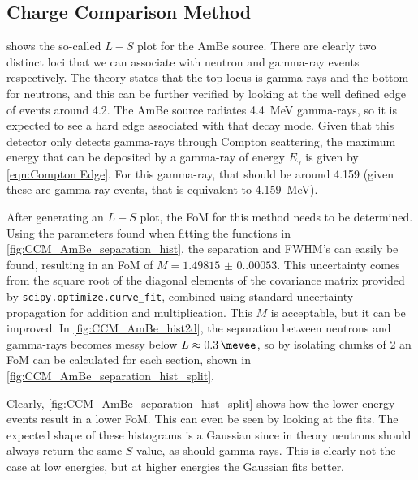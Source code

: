 \documentclass[11pt]{article}
\numberwithin{equation}{section}
\numberwithin{figure}{section}
\numberwithin{table}{section}
\begin{document}
\subsection{Charge Comparison Method}
\par {} shows the so-called $L-S$ plot for the AmBe source. There are clearly two distinct loci that we can associate with neutron and gamma-ray events respectively. The theory states that the top locus is gamma-rays and the bottom for neutrons, and this can be further verified by looking at the well defined edge of events around \SI{4.2}{\mevee}. The AmBe source radiates \SI{4.4}{\mega\electronvolt} gamma-rays, so it is expected to see a hard edge associated with that decay mode. Given that this detector only detects gamma-rays through Compton scattering, the maximum energy that can be deposited by a gamma-ray of energy $E_\gamma$ is given by \cref{eqn:Compton Edge}. For this gamma-ray, that should be around \SI{4.159}{\mevee} (given these are gamma-ray events, that is equivalent to \SI{4.159}{\mega\electronvolt}). 
\par After generating an $L-S$ plot, the FoM for this method needs to be determined. Using the parameters found when fitting the functions in \cref{fig:CCM_AmBe_separation_hist}, the separation and FWHM's can easily be found, resulting in an FoM of $M=\num{1.49815(0.00053)}$. This uncertainty comes from the square root of the diagonal elements of the covariance matrix provided by \texttt{scipy.optimize.curve\_fit}, combined using standard uncertainty propagation for addition and multiplication. This $M$ is acceptable, but it can be improved. In \cref{fig:CCM_AmBe_hist2d}, the separation between neutrons and gamma-rays becomes messy below $L\approx\SI{0.3}{\mevee}$, so by isolating chunks of \SI{2}{\mevee} an FoM can be calculated for each section, shown in \cref{fig:CCM_AmBe_separation_hist_split}.
\par Clearly, \cref{fig:CCM_AmBe_separation_hist_split} shows how the lower energy events result in a lower FoM. This can even be seen by looking at the fits. The expected shape of these histograms is a Gaussian since in theory neutrons should always return the same $S$ value, as should gamma-rays. This is clearly not the case at low energies, but at higher energies the Gaussian fits better. 
\end{document}
